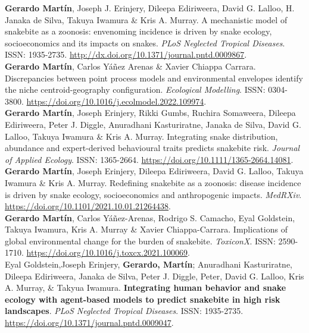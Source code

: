 \documentclass[11pt, letter]{article}
\newcommand{\years}[1]{\marginnote{\scriptsize #1}}
\begin{document}
\years{2022} \textbf{Gerardo Mart\'in}, Joseph J. Erinjery, Dileepa Ediriweera, David G. Lalloo, H. Janaka de Silva, Takuya Iwamura \& Kris A. Murray. A mechanistic model of snakebite as a zoonosis: envenoming incidence is driven by snake ecology, socioeconomics and its impacts on snakes. \emph{PLoS Neglected Tropical Diseases}. ISSN: 1935-2735. \url{http://dx.doi.org/10.1371/journal.pntd.0009867}.\\

\years{2022} \textbf{Gerardo Mart\'in}, Carlos Y\'a\~nez Arenas \& Xavier Chiappa Carrara. Discrepancies between point process models and environmental envelopes identify the niche centroid-geography configuration. \emph{Ecological Modelling}. ISSN: 0304-3800. \url{https://doi.org/10.1016/j.ecolmodel.2022.109974}.\\

\years{2021} \textbf{Gerardo Mart\'in}, Joseph Erinjery, Rikki Gumbs, Ruchira Somaweera, Dileepa Ediriweera, Peter J. Diggle, Anuradhani Kasturiratne, Janaka de Silva, David G. Lalloo, Takuya Iwamura \& Kris A. Murray. Integrating snake distribution, abundance and expert-derived behavioural traits predicts snakebite risk. \emph{Journal of Applied Ecology}. ISSN: 1365-2664. \url{https://doi.org/10.1111/1365-2664.14081}.\\

\years{2021} \textbf{Gerardo Mart\'in}, Joseph Erinjery, Dileepa Ediriweera, David G. Lalloo, Takuya Iwamura \& Kris A. Murray. Redefining snakebite as a zoonosis: disease incidence is driven by snake ecology, socioeconomics and anthropogenic impacts. \emph{MedRXiv}. \url{https://doi.org/10.1101/2021.10.01.21264438}.\\

\years{2021} \textbf{Gerardo Martín}, Carlos Y\'a\~nez-Arenas, Rodrigo S. Camacho, Eyal Goldstein, Takuya Iwamura, Kris A. Murray \& Xavier Chiappa-Carrara. Implications of global environmental change for the burden of snakebite. \emph{ToxiconX}. ISSN: 2590-1710. \url{https://doi.org/10.1016/j.toxcx.2021.100069}.\\

\years{2021} Eyal Goldstein,Joseph Erinjery, \textbf{Gerardo, Mart\'in}; Anuradhani Kasturiratne, Dileepa Ediriweera, Janaka de Silva, Peter J. Diggle, Peter, David G. Lalloo, Kris A. Murray, \& Takyua Iwamura. \textbf{Integrating human behavior and snake ecology with agent-based models to predict snakebite in high risk landscapes}. \emph{PLoS Neglected Tropical Diseases}. ISSN: 1935-2735. \url{https://doi.org/10.1371/journal.pntd.0009047}.\\
\end{document}
